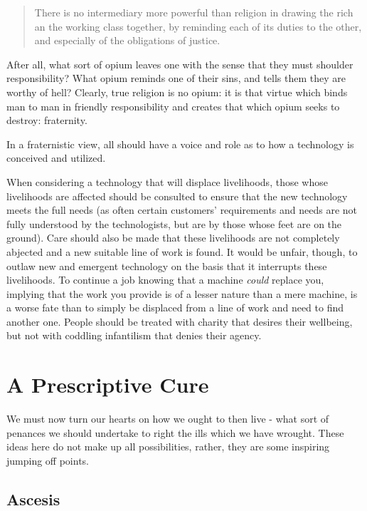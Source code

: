 \documentclass[letterpaper]{article}
\begin{document}
\begin{quote}
  There is no intermediary more powerful than religion in drawing the rich an the working class together, by reminding each of its duties to the other, and especially of the obligations of justice.
\end{quote}

After all, what sort of opium leaves one with the sense that they must shoulder responsibility? What opium reminds one of their sins, and tells them they are worthy of hell? Clearly, true religion is no opium: it is that virtue which binds man to man in friendly responsibility and creates that which opium seeks to destroy: fraternity.

In a fraternistic view, all should have a voice and role as to how a technology is conceived and utilized.

When considering a technology that will displace livelihoods, those whose livelihoods are affected should be consulted to ensure that the new technology meets the full needs (as often certain customers' requirements and needs are not fully understood by the technologists, but are by those whose feet are on the ground). Care should also be made that these livelihoods are not completely abjected and a new suitable line of work is found. It would be unfair, though, to outlaw new and emergent technology on the basis that it interrupts these livelihoods. To continue a job knowing that a machine \textit{could} replace you, implying that the work you provide is of a lesser nature than a mere machine, is a worse fate than to simply be displaced from a line of work and need to find another one. People should be treated with charity that desires their wellbeing, but not with coddling infantilism that denies their agency.

\section{A Prescriptive Cure}

We must now turn our hearts on how we ought to then live - what sort of penances we should undertake to right the ills which we have wrought. These ideas here do not make up all possibilities, rather, they are some inspiring jumping off points.

\subsection{Ascesis}
\end{document}
